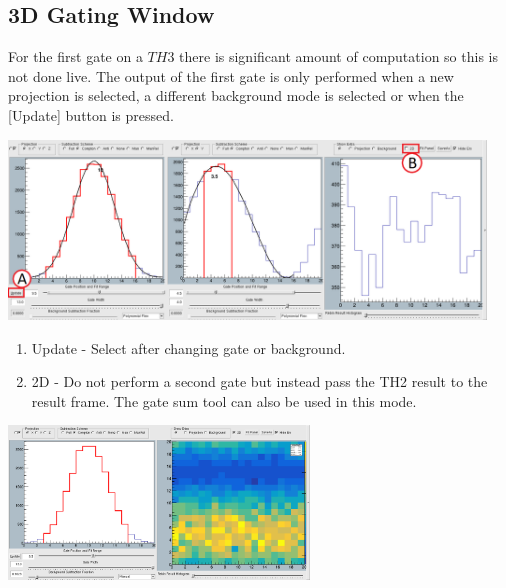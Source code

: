 \documentclass[a4paper,10pt]{article}
\begin{document}
\subsection{3D Gating Window}
For the first gate on a $TH3$ there is significant amount of computation so this is not done live. The output of the first gate is only performed when a new projection is selected, a different background mode is selected or when the [Update] button is pressed.
\begin{center}
\includegraphics[width=0.95\textwidth]{toolE.png}
\begin{enumerate}
\item Update - Select after changing gate or background.
\item 2D - Do not perform a second gate but instead pass the TH2 result to the result frame. The gate sum tool can also be used in this mode.
\end{enumerate}
\includegraphics[width=0.6\textwidth]{toolF.png}
\end{center}

\newpage
\end{document}
